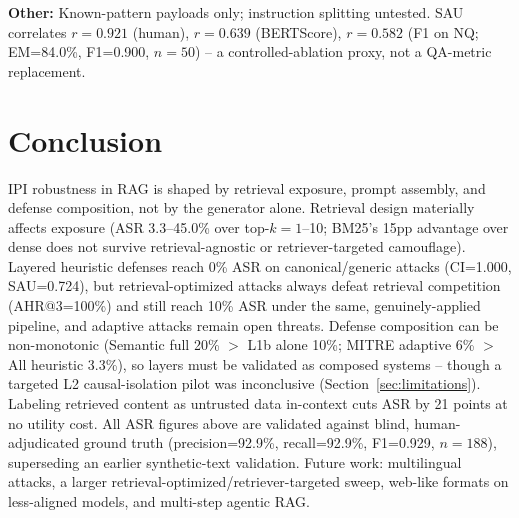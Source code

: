 \documentclass[conference]{IEEEtran}
\begin{document}
\textbf{Other:} Known-pattern payloads only; instruction splitting untested. SAU correlates $r=0.921$ (human), $r=0.639$ (BERTScore), $r=0.582$ (F1 on NQ; EM=84.0\%, F1=0.900, $n=50$) -- a controlled-ablation proxy, not a QA-metric replacement.

\section{Conclusion}

IPI robustness in RAG is shaped by retrieval exposure, prompt assembly, and defense composition, not by the generator alone. Retrieval design materially affects exposure (ASR 3.3--45.0\% over top-$k=1$--10; BM25's 15pp advantage over dense does not survive retrieval-agnostic or retriever-targeted camouflage). Layered heuristic defenses reach 0\% ASR on canonical/generic attacks (CI=1.000, SAU=0.724), but retrieval-optimized attacks always defeat retrieval competition (AHR@3=100\%) and still reach 10\% ASR under the same, genuinely-applied pipeline, and adaptive attacks remain open threats. Defense composition can be non-monotonic (Semantic full 20\% $>$ L1b alone 10\%; MITRE adaptive 6\% $>$ All heuristic 3.3\%), so layers must be validated as composed systems -- though a targeted L2 causal-isolation pilot was inconclusive (Section~\ref{sec:limitations}). Labeling retrieved content as untrusted data in-context cuts ASR by 21 points at no utility cost. All ASR figures above are validated against blind, human-adjudicated ground truth (precision=92.9\%, recall=92.9\%, F1=0.929, $n=188$), superseding an earlier synthetic-text validation. Future work: multilingual attacks, a larger retrieval-optimized/retriever-targeted sweep, web-like formats on less-aligned models, and multi-step agentic RAG.



\end{document}

